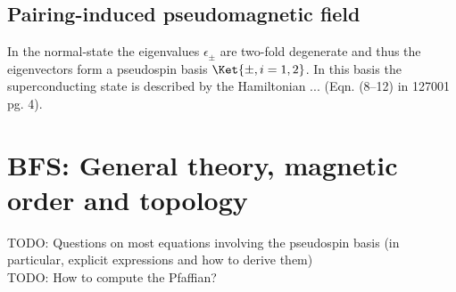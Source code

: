 \documentclass[english, parskip=full]{scrartcl}
\newcommand{\qna}[1]{\color{red}#1\color{black}}
\begin{document}
\subsection{Pairing-induced pseudomagnetic field}
In the normal-state the eigenvalues $\epsilon_\pm$ are two-fold degenerate and thus the eigenvectors form a pseudospin basis $\Ket{\pm ,i=1,2}$.
In this basis the superconducting state is described by the Hamiltonian ... (\qna{Eqn. (8--12) in 127001 pg. 4}).
\section{BFS: General theory, magnetic order and topology}
TODO: Questions on most equations involving the pseudospin basis (in particular, explicit expressions and how to derive them)\\
TODO: How to compute the Pfaffian?
\end{document}
